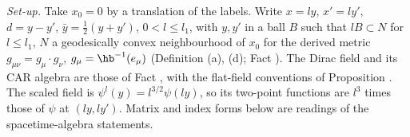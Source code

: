 \emph{Set-up.} Take $x_{0} = 0$ by a translation of the labels. Write $x = ly$, $x' = ly'$, $d = y - y'$, $\bar y = \tfrac12(y + y')$, $0 < l \le l_{1}$, with $y, y'$ in a ball $B$ such that $lB \subset N$ for $l \le l_{1}$, $N$ a geodesically convex neighbourhood of $x_{0}$ for the derived metric $g_{\mu\nu} = g_{\mu}\cdot g_{\nu}$, $g_{\mu} = \hb^{-1}(e_{\mu})$ (Definition (a), (d); Fact ). The Dirac field and its CAR algebra are those of Fact , with the flat-field conventions of Proposition . The scaled field is $\psi^{l}(y) = l^{3/2}\psi(ly)$, so its two-point functions are $l^{3}$ times those of $\psi$ at $(ly, ly')$. Matrix and index forms below are readings of the spacetime-algebra statements.

